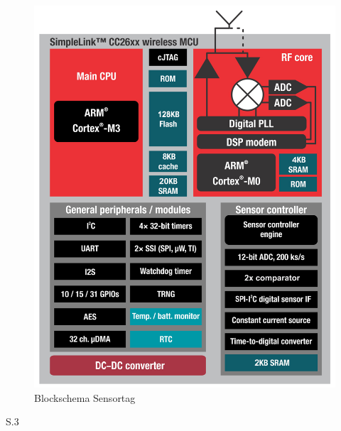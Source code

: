 \begin{figure}[h]
    \includegraphics {7Anhang/imag/CC26xx_Block_Diagram.png} 
     \caption{Blockschema Sensortag}
\end{figure}

\cite{Sensortag_Datasheet}S.3


%
%
%
%
%